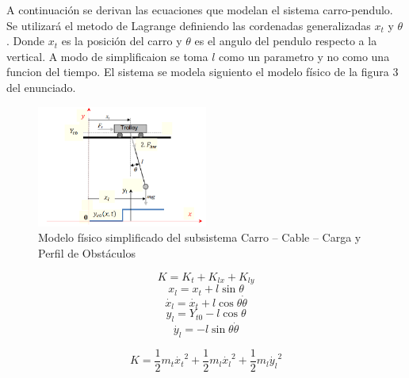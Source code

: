 \documentclass{article}
\begin{document}
            A continuación se derivan las ecuaciones que modelan el sistema carro-pendulo. Se utilizará el metodo de Lagrange definiendo las cordenadas generalizadas 
            \(x_t\) y \(\theta\) . Donde \(x_t\) es la posición del carro y \(\theta\) es el angulo del pendulo respecto a la vertical. 
            A modo de simplificaion se toma \(l\) como un parametro y no como una funcion del tiempo.
            El sistema se modela siguiento el modelo físico de la figura 3 del enunciado.
            \begin{figure}[H]
                \centering
                \includegraphics[width=0.5\textwidth]{figs/figure3_enunciado.png}
                \caption{Modelo físico simplificado del subsistema Carro – Cable – Carga y Perfil de Obstáculos}
                \label{fig:pendulo}
            \end{figure}
            
            \begin{equation}\label{eq:kinetic1}
                K = K_t + K_{lx} + K_{ly}
            \end{equation}
            \begin{equation}\label{eq:xl}
                x_l=x_t+l\sin{\theta}
            \end{equation}
            \begin{equation}\label{eq:dxl}
                \dot{x_l}=\dot{x_t}+l\cos{\theta}\dot{\theta}
            \end{equation}
            \begin{equation}\label{eq:y}
                y_l=Y_{t0}-l\cos{\theta}
            \end{equation}
            \begin{equation}\label{eq:dy}
                \dot{y_l}=-l\sin{\theta}\dot{\theta}
            \end{equation}

            \begin{equation}\label{eq:kinetic2}
                K = \frac{1}{2}m_t\dot{x_t}^2   +\frac{1}{2}m_l\dot{x_l}^2  +\frac{1}{2}m_l\dot{y_l}^2
            \end{equation}
\end{document}
